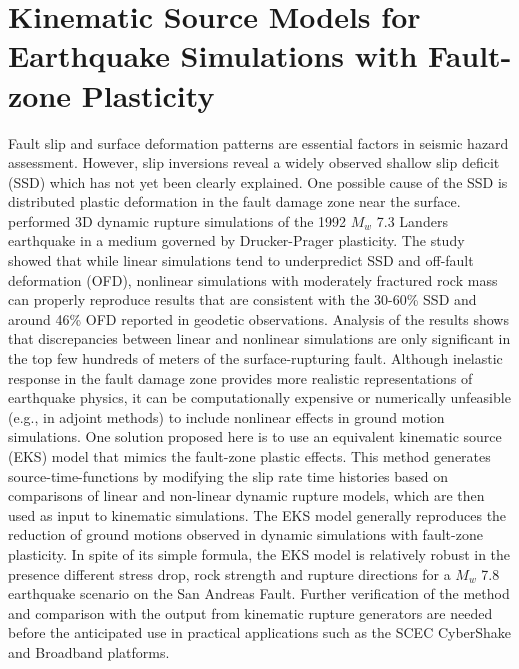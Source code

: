 
\linespread{1.7}
\chapter{Kinematic Source Models for Earthquake Simulations with Fault-zone Plasticity}
\linespread{2.0}
\label{chap:eks}

\graphicspath{{/Users/zhh076/work/PhD_way/eks/}}

Fault slip and surface deformation patterns are essential factors in seismic hazard assessment. However, slip inversions reveal a widely observed shallow slip deficit (SSD) which has not yet been clearly explained. One possible cause of the SSD is distributed plastic deformation in the fault damage zone near the surface. \citet{rotenOfffaultDeformationsShallow2017} performed 3D dynamic rupture simulations of the 1992 $M_w$ 7.3 Landers earthquake in a medium governed by Drucker-Prager plasticity. The study showed that while linear simulations tend to underpredict SSD and off-fault deformation (OFD), nonlinear simulations with moderately fractured rock mass can properly reproduce results that are consistent with the 30-60\% SSD and around 46\% OFD reported in geodetic observations. Analysis of the \citet{rotenOfffaultDeformationsShallow2017} results shows that discrepancies between linear and nonlinear simulations are only significant in the top few hundreds of meters of the surface-rupturing fault. Although inelastic response in the fault damage zone provides more realistic representations of earthquake physics, it can be computationally expensive or numerically unfeasible (e.g., in adjoint methods) to include nonlinear effects in ground motion simulations. One solution proposed here is to use an equivalent kinematic source (EKS) model that mimics the fault-zone plastic effects. This method generates source-time-functions by modifying the slip rate time histories based on comparisons of linear and non-linear dynamic rupture models, which are then used as input to kinematic simulations. The EKS model generally reproduces the reduction of ground motions observed in dynamic simulations with fault-zone plasticity. In spite of its simple formula, the EKS model is relatively robust in the presence different stress drop, rock strength and rupture directions for a $M_w$ 7.8 earthquake scenario on the San Andreas Fault. Further verification of the method and comparison with the output from kinematic rupture generators are needed before the anticipated use in practical applications such as the SCEC CyberShake and Broadband platforms.


